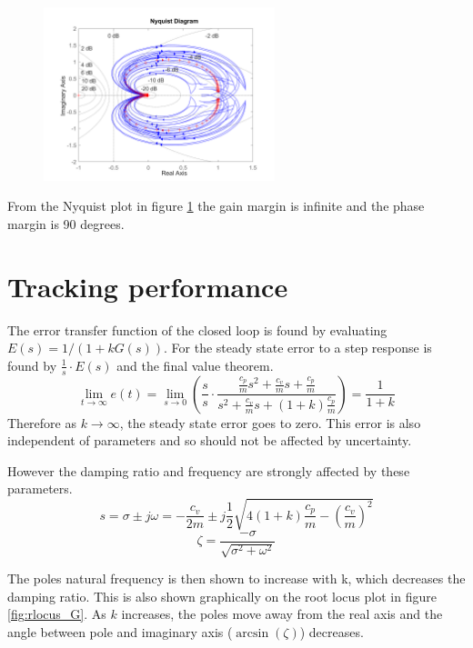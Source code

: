 \documentclass{article}
\begin{document}
\begin{figure}[H]
    \centering
    \includegraphics[width=0.6\textwidth]{figures/nyquist_G.png}
    \caption{}
    \label{fig:nyquist_G}
\end{figure}

From the Nyquist plot in figure \ref{fig:nyquist_G} the gain margin is infinite and the phase margin is 90 degrees.

\section{Tracking performance}


The error transfer function of the closed loop is found by evaluating $E(s) = 1/(1+kG(s))$.
For the steady state error to a step response is found by $\frac{1}{s} \cdot E(s)$ and the final value theorem.
\begin{equation}
    \lim_{t \to \infty} e(t) = \lim_{s \to 0} \left( \frac{s}{s} \cdot \frac{\frac{c_p}{m}s^2 + \frac{c_v}{m}s + \frac{c_p}{m}}{s^2 + \frac{c_v}{m}s + (1+k)\frac{c_p}{m}} \right) = \frac{1}{1+k}
\end{equation}
Therefore as $k \to \infty$, the steady state error goes to zero.
This error is also independent of parameters and so should not be affected by uncertainty.

However the damping ratio and frequency are strongly affected by these parameters.
\begin{equation}
    s = \sigma \pm j\omega = -\frac{c_v}{2m} \pm j \frac{1}{2} \sqrt{4(1+k)\frac{c_p}{m} - \left(\frac{c_v}{m}\right)^2}
\end{equation}
\begin{equation}
    \zeta = \frac{-\sigma }{ \sqrt{\sigma^2 + \omega^2}}
\end{equation}

The poles natural frequency is then shown to increase with k, which decreases the damping ratio.
This is also shown graphically on the root locus plot in figure \ref{fig:rlocus_G}.
As $k$ increases, the poles move away from the real axis and the angle between pole and imaginary axis ($\arcsin(\zeta)$) decreases.
\end{document}
